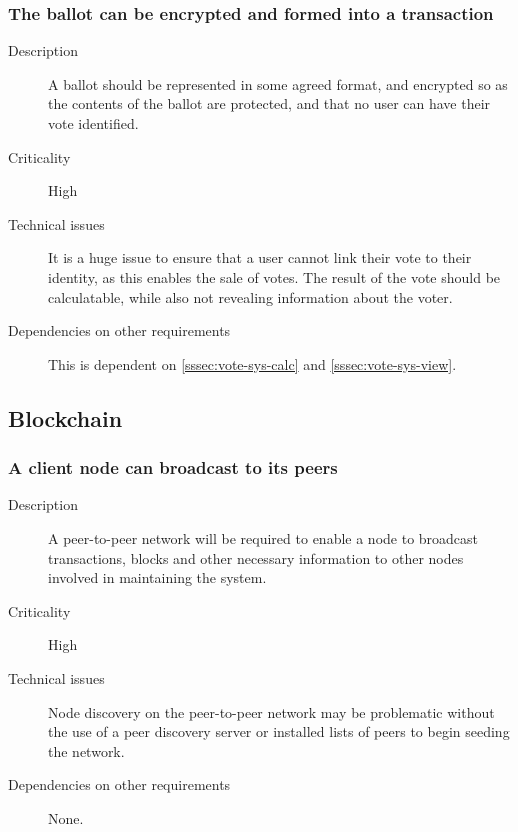 \documentclass[a4paper,12pt]{article}
\begin{document}
\subsubsection{The ballot can be encrypted and formed into a transaction}
\label{sssec:ballot-enc-trans}
\begin{description}
	\item[Description]
		A ballot should be represented in some agreed format, and encrypted so as the contents of the ballot are protected, and that no user can have their vote identified.
	\item[Criticality]
		High
	\item[Technical issues]
		It is a huge issue to ensure that a user cannot link their vote to their identity, as this enables the sale of votes. The result of the vote should be calculatable, while also not revealing information about the voter.
	\item[Dependencies on other requirements]
		This is dependent on \ref{sssec:vote-sys-calc} and \ref{sssec:vote-sys-view}.
\end{description}

\subsection{Blockchain}
\label{subsec:blockchain}

\subsubsection{A client node can broadcast to its peers}
\label{sssec:blk-comms}
\begin{description}
	\item[Description]
		A peer-to-peer network will be required to enable a node to broadcast transactions, blocks and other necessary information to other nodes involved in maintaining the system.
	\item[Criticality]
		High
	\item[Technical issues]
		Node discovery on the peer-to-peer network may be problematic without the use of a peer discovery server or installed lists of peers to begin seeding the network.
	\item[Dependencies on other requirements]
		None.
\end{description}
\end{document}
